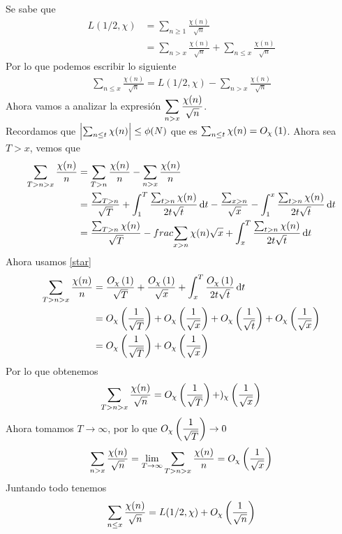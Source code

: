 \begin{sol}
	Se sabe que
	\begin{align*}
		L(1/2,\chi) & =\sum_{n\geq1}\frac{\chi(n)}{\sqrt{n}}                                     \\
		            & =\sum_{n>x}\frac{\chi(n)}{\sqrt{n}}+\sum_{n\leq x}\frac{\chi(n)}{\sqrt{n}}
	\end{align*}
	Por lo que podemos escribir lo siguiente
	\begin{align*}
		\sum_{n\leq x}\frac{\chi(n)}{\sqrt{n}}=L(1/2,\chi)-\sum_{n>x}\frac{\chi(n)}{\sqrt{n}}
	\end{align*}
	Ahora vamos a analizar la expresión $\ds\sum_{n>x}\frac{\chi(n)}{\sqrt{n}}$.\\
	Recordamos que $\abs{\sum_{n\leq t}\chi(n)}\leq\phi(N)$ que es $\sum_{n\leq t}\chi(n)=\BigO[\chi]{1}\label{star}$. Ahora sea $T>x$, vemos que
	\begin{align*}
		\sum_{T>n>x}\frac{\chi(n)}{n} & =\sum_{T>n}\frac{\chi(n)}{n}-\sum_{n>x}\frac{\chi(n)}{n}                                                                                                     \\
		                              & =\frac{\sum_{T>n}}{\sqrt{T}}+\int_1^T\frac{\sum_{t>n}\chi(n)}{2t\sqrt{t}}\d{t}-\frac{\sum_{x>n}}{\sqrt{x}}-\int_1^x\frac{\sum_{t>n}\chi(n)}{2t\sqrt{t}}\d{t} \\
		                              & =\frac{\sum_{T>n}\chi(n)}{\sqrt{T}}-frac{\sum_{x>n}\chi(n)}{\sqrt{x}}+\int_x^T\frac{\sum_{t>n}\chi(n)}{2t\sqrt{t}}\d{t}
	\end{align*}
	Ahora usamos \eqref{star}
	\begin{align*}
		\sum_{T>n>x}\frac{\chi(n)}{n} & = \frac{\BigO[\chi]{1}}{\sqrt{T}}+\frac{\BigO[\chi]{1}}{\sqrt{x}}+\int_x^T\frac{\BigO[\chi]{1}}{2t\sqrt{t}}\d{t}         \\
		                              & =\BigO[\chi]{\frac1{\sqrt{T}}}+\BigO[\chi]{\frac1{\sqrt{x}}}+\BigO[\chi]{\frac1{\sqrt{t}}}+\BigO[\chi]{\frac1{\sqrt{x}}} \\
		                              & =\BigO[\chi]{\frac1{\sqrt{T}}}+\BigO[\chi]{\frac1{\sqrt{x}}}
	\end{align*}
	Por lo que obtenemos
	\begin{equation*}
		\sum_{T>n>x}\frac{\chi(n)}{\sqrt{n}}=\BigO[\chi]{\frac1{\sqrt{T}}}+)_\chi\paren{\frac1{\sqrt{x}}}
	\end{equation*}
	Ahora tomamos $T\rightarrow\infty$, por lo que $\BigO[\chi]{\dfrac1{\sqrt{T}}}\rightarrow0$
	\begin{equation*}
		\sum_{n>x}\frac{\chi(n)}{\sqrt{n}}=\lim_{T\rightarrow\infty}\sum_{T>n>x}\frac{\chi(n)}{n}=\BigO[\chi]{\frac1{\sqrt{x}}}
	\end{equation*}
	Juntando todo tenemos
	\begin{equation*}
		\sum_{n\leq x}\frac{\chi(n)}{\sqrt{n}}=L(1/2,\chi)+\BigO[\chi]{\frac1{\sqrt{n}}}
	\end{equation*}
\end{sol}

